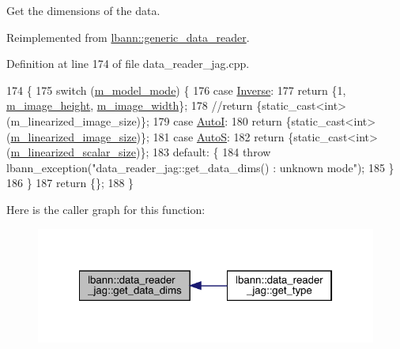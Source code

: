 Get the dimensions of the data. 



Reimplemented from \hyperlink{classlbann_1_1generic__data__reader_ae06ff27459ac4a5d8ac14655d4b31318}{lbann\+::generic\+\_\+data\+\_\+reader}.



Definition at line 174 of file data\+\_\+reader\+\_\+jag.\+cpp.


\begin{DoxyCode}
174                                                           \{
175   \textcolor{keywordflow}{switch} (\hyperlink{classlbann_1_1data__reader__jag_a877eb1f0eb2afccd73cd7d69407ff6e2}{m\_model\_mode}) \{
176     \textcolor{keywordflow}{case} \hyperlink{classlbann_1_1data__reader__jag_a114c369c8604df385cf7a3ec20c9739ba2d3bba9f202270762169c1c01d2fb7a4}{Inverse}:
177       \textcolor{keywordflow}{return} \{1, \hyperlink{classlbann_1_1data__reader__jag_a6178d5dffd5e9bf7cf5703613cf9bd2e}{m\_image\_height}, \hyperlink{classlbann_1_1data__reader__jag_a193a91f2aab9f6373a7b376ff183cd0e}{m\_image\_width}\};
178       \textcolor{comment}{//return \{static\_cast<int>(m\_linearized\_image\_size)\};}
179     \textcolor{keywordflow}{case} \hyperlink{classlbann_1_1data__reader__jag_a114c369c8604df385cf7a3ec20c9739bae9c49fc4443020e18086fc83ce0b369b}{AutoI}:
180       \textcolor{keywordflow}{return} \{\textcolor{keyword}{static\_cast<}\textcolor{keywordtype}{int}\textcolor{keyword}{>}(\hyperlink{classlbann_1_1data__reader__jag_a7c2aa5f489e7c7a3236c1f6c4a760048}{m\_linearized\_image\_size})\};
181     \textcolor{keywordflow}{case} \hyperlink{classlbann_1_1data__reader__jag_a114c369c8604df385cf7a3ec20c9739baab2b8e8bef02dfc8ffaae80bdd0a7fd4}{AutoS}:
182       \textcolor{keywordflow}{return} \{\textcolor{keyword}{static\_cast<}\textcolor{keywordtype}{int}\textcolor{keyword}{>}(\hyperlink{classlbann_1_1data__reader__jag_a856b4b9cdf9d8569e5fef1d5d996870d}{m\_linearized\_scalar\_size})\};
183     \textcolor{keywordflow}{default}: \{
184       \textcolor{keywordflow}{throw} lbann\_exception(\textcolor{stringliteral}{"data\_reader\_jag::get\_data\_dims() : unknown mode"});
185     \}
186   \}
187   \textcolor{keywordflow}{return} \{\};
188 \}
\end{DoxyCode}
Here is the caller graph for this function\+:\nopagebreak
\begin{figure}[H]
\begin{center}
\leavevmode
\includegraphics[width=322pt]{classlbann_1_1data__reader__jag_af724f9e38e98e9a4d46f18e7ccadcbb3_icgraph}
\end{center}
\end{figure}
